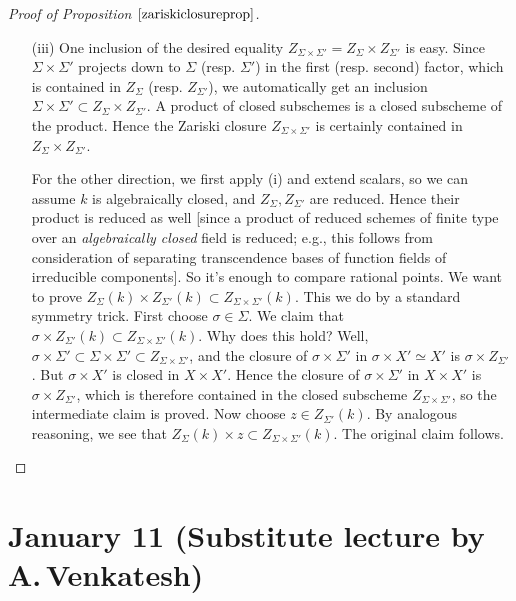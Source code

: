 \documentclass[10pt]{article}
\renewcommand{\(}{\left(}
\renewcommand{\)}{\right)}
\numberwithin{thm}{subsection}
\begin{document}
\begin{proof}[Proof of Proposition $\ref{zariskiclosureprop}$]
\begin{itemize}
\item[(iii)] One inclusion of the desired equality $Z_{\Sigma\times \Sigma'}=Z_{\Sigma}\times Z_{\Sigma'}$ is easy. Since $\Sigma\times\Sigma'$ projects
down to $\Sigma$ (resp. $\Sigma'$) in the first (resp. second)
factor,
which is contained in $Z_{\Sigma}$ (resp. $Z_{\Sigma'}$), we automatically
get an inclusion $\Sigma\times\Sigma'\subset Z_\Sigma\times Z_{\Sigma'}$.
A product of closed  subschemes is a closed subscheme of the product.
Hence the Zariski closure $Z_{\Sigma\times \Sigma'}$ is certainly
contained in $Z_\Sigma\times Z_{\Sigma'}$.

For the other direction, we first apply (i) and extend scalars, so we can assume $k$ is algebraically closed, and $Z_{\Sigma},Z_{\Sigma'}$ are reduced.
Hence their product is reduced as well [since a product of reduced schemes of finite type 
over an {\em algebraically closed} field is reduced; e.g., this follows from consideration of
separating transcendence bases of function fields of irreducible components].
So it's enough to compare rational points. We want to prove
$Z_\Sigma(k)\times Z_{\Sigma'}(k)\subset Z_{\Sigma\times \Sigma'}(k)$.
This we do by a standard symmetry trick.
First choose $\sigma\in \Sigma$.
We claim that $\sigma\times Z_{\Sigma'}(k)\subset  Z_{\Sigma\times \Sigma'}(k)$.
Why does this hold? 
Well,  $\sigma\times \Sigma'\subset \Sigma\times \Sigma'\subset Z_{\Sigma\times\Sigma'}$,
and the closure of $\sigma\times \Sigma'$
in $\sigma\times X'\simeq X'$
is $\sigma\times Z_{\Sigma'}$.
But $\sigma\times X'$ is closed in $X\times X'$.
Hence the closure of $\sigma\times \Sigma'$ in $X\times X'$
is $\sigma\times Z_{\Sigma'}$,
which is therefore contained in the closed subscheme $Z_{\Sigma\times \Sigma'}$, so the intermediate claim
is proved.  Now choose $z\in Z_{\Sigma'}(k)$.  
By analogous reasoning, we see that $Z_\Sigma(k)\times z\subset Z_{\Sigma\times \Sigma'}(k)$. The 
original claim follows.
\end{itemize}
\end{proof}

\section{January 11 (Substitute lecture by A.\,Venkatesh)}
\end{document}
